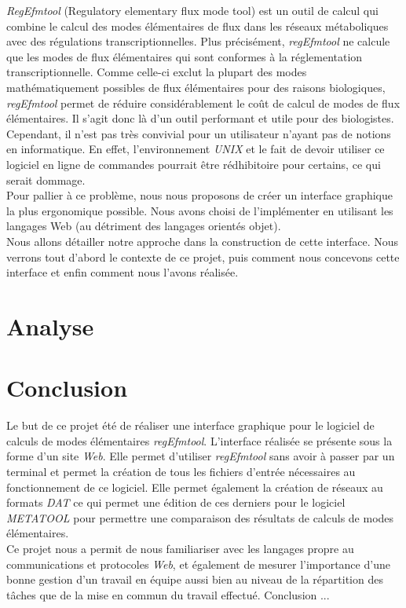 \documentclass[12pt,a4paper]{report}
\begin{document}
\emph{RegEfmtool} (Regulatory elementary flux mode tool) est un outil de calcul qui combine le calcul des modes élémentaires de flux dans les réseaux métaboliques avec des régulations transcriptionnelles. Plus précisément, \emph{regEfmtool} ne calcule que les modes de flux élémentaires qui sont conformes à la réglementation transcriptionnelle. Comme celle-ci exclut la plupart des modes mathématiquement possibles de flux élémentaires pour des raisons biologiques, \emph{regEfmtool} permet de réduire considérablement le coût de calcul de modes de flux élémentaires. Il s'agit donc là d'un outil performant et utile pour des biologistes. Cependant, il n'est pas très convivial pour un utilisateur n'ayant pas de notions en informatique. En effet, l'environnement \emph{UNIX} et le fait de devoir utiliser ce logiciel en ligne de commandes pourrait être rédhibitoire pour certains, ce qui serait dommage. \\

Pour pallier à ce problème, nous nous proposons de créer un interface graphique la plus ergonomique possible. Nous avons choisi de l'implémenter en utilisant les langages Web (au détriment des langages orientés objet). \\

Nous allons détailler notre approche dans la construction de cette interface. Nous verrons tout d'abord le contexte de ce projet, puis comment nous concevons cette interface et enfin comment nous l'avons réalisée. 

\chapter{Analyse}


\pagebreak

\pagebreak






\chapter*{Conclusion}
Le but de ce projet été de réaliser une interface graphique pour le logiciel de calculs de modes élémentaires \textit{regEfmtool}. L'interface réalisée se présente sous la forme d'un site \emph{Web}. Elle permet d'utiliser \emph{regEfmtool} sans avoir à passer par un terminal et permet la création de tous les fichiers d'entrée nécessaires au fonctionnement de ce logiciel.
Elle permet également la création de réseaux au formats \emph{DAT} ce qui permet une édition de ces derniers pour le logiciel \emph{METATOOL} pour permettre une comparaison des résultats de calculs de modes élémentaires.\\

Ce projet nous a permit de nous familiariser avec les langages propre au communications et protocoles \emph{Web}, et également de mesurer l'importance d'une bonne gestion d'un travail en équipe aussi bien au niveau de la répartition des tâches que de la mise en commun du travail effectué.
Conclusion ...



\end{document}
